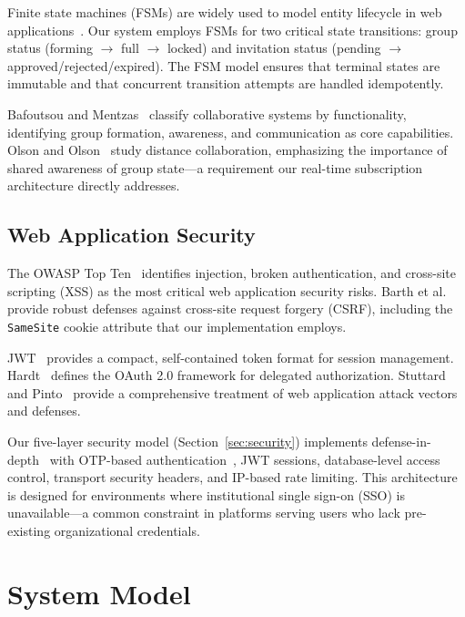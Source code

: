 \documentclass[11pt,a4paper]{article}
\theoremstyle{plain}
\theoremstyle{definition}
\begin{document}
Finite state machines (FSMs) are widely used to model entity lifecycle in web applications~\cite{hopcroft1971}. Our system employs FSMs for two critical state transitions: group status (forming $\rightarrow$ full $\rightarrow$ locked) and invitation status (pending $\rightarrow$ approved/rejected/expired). The FSM model ensures that terminal states are immutable and that concurrent transition attempts are handled idempotently.

Bafoutsou and Mentzas~\cite{bafoutsou2002} classify collaborative systems by functionality, identifying group formation, awareness, and communication as core capabilities. Olson and Olson~\cite{olson2000} study distance collaboration, emphasizing the importance of shared awareness of group state---a requirement our real-time subscription architecture directly addresses.

\subsection{Web Application Security}

The OWASP Top Ten~\cite{owasp2021} identifies injection, broken authentication, and cross-site scripting (XSS) as the most critical web application security risks. Barth et al.~\cite{barth2008} provide robust defenses against cross-site request forgery (CSRF), including the \texttt{SameSite} cookie attribute that our implementation employs.

JWT~\cite{jones2015} provides a compact, self-contained token format for session management. Hardt~\cite{hardt2012} defines the OAuth 2.0 framework for delegated authorization. Stuttard and Pinto~\cite{stuttard2011} provide a comprehensive treatment of web application attack vectors and defenses.

Our five-layer security model (Section~\ref{sec:security}) implements defense-in-depth~\cite{owasp2021} with OTP-based authentication~\cite{mraihi2011}, JWT sessions, database-level access control, transport security headers, and IP-based rate limiting. This architecture is designed for environments where institutional single sign-on (SSO) is unavailable---a common constraint in platforms serving users who lack pre-existing organizational credentials.

\section{System Model}
\label{sec:model}
\end{document}
